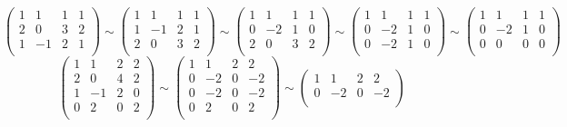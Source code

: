 \begin{example}
  $$
    \begin{pmatrix}
      1 & 1  & 1 & 1 \\
      2 & 0  & 3 & 2 \\
      1 & -1 & 2 & 1 \\
    \end{pmatrix}
    \sim
    \begin{pmatrix}
      1 & 1  & 1 & 1 \\
      1 & -1 & 2 & 1 \\
      2 & 0  & 3 & 2 \\
    \end{pmatrix}
    \sim
    \begin{pmatrix}
      1 & 1  & 1 & 1 \\
      0 & -2 & 1 & 0 \\
      2 & 0  & 3 & 2 \\
    \end{pmatrix}
    \sim
    \begin{pmatrix}
      1 & 1  & 1 & 1 \\
      0 & -2 & 1 & 0 \\
      0 & -2 & 1 & 0 \\
    \end{pmatrix}
    \sim
    \begin{pmatrix}
      1 & 1  & 1 & 1 \\
      0 & -2 & 1 & 0 \\
      0 & 0  & 0 & 0 \\
    \end{pmatrix}
  $$
  $$
    \begin{pmatrix}
      1 & 1  & 2 & 2 \\
      2 & 0  & 4 & 2 \\
      1 & -1 & 2 & 0 \\
      0 & 2  & 0 & 2 \\
    \end{pmatrix}
    \sim
    \begin{pmatrix}
      1 & 1  & 2 & 2  \\
      0 & -2 & 0 & -2 \\
      0 & -2 & 0 & -2 \\
      0 & 2  & 0 & 2  \\
    \end{pmatrix}
    \sim
    \begin{pmatrix}
      1 & 1  & 2 & 2  \\
      0 & -2 & 0 & -2 \\

\end{pmatrix}$$
\end{example}
